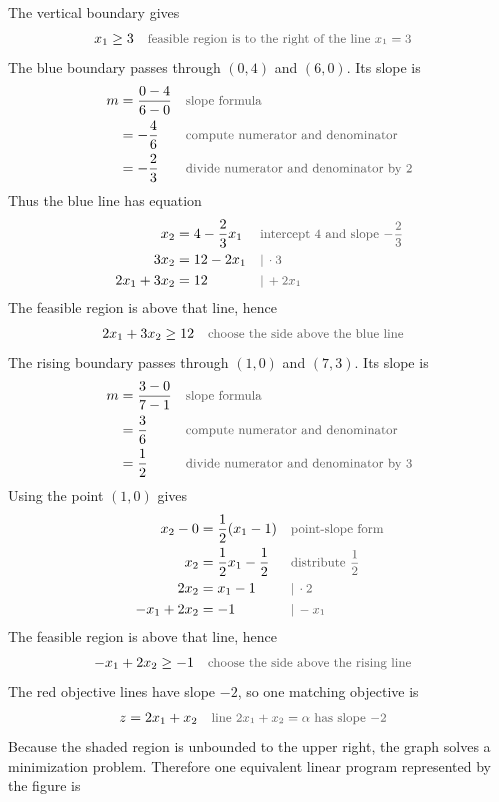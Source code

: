 \documentclass[a4paper,11pt]{article}
\newcommand{\why}[1]{\text{\small\color{black!65}#1}}
\begin{document}
The vertical boundary gives
\begin{align*}
x_1&\ge3 && \why{feasible region is to the right of the line $x_1=3$}
\end{align*}
The blue boundary passes through $(0,4)$ and $(6,0)$. Its slope is
\begin{align*}
m&=\frac{0-4}{6-0} && \why{slope formula}\\
&=-\frac{4}{6} && \why{compute numerator and denominator}\\
&=-\frac{2}{3} && \why{divide numerator and denominator by $2$}
\end{align*}
Thus the blue line has equation
\begin{align*}
x_2&=4-\frac{2}{3}x_1 && \why{intercept $4$ and slope $-\frac23$}\\
3x_2&=12-2x_1 && \why{$|\,\cdot3$}\\
2x_1+3x_2&=12 && \why{$|\,+2x_1$}
\end{align*}
The feasible region is above that line, hence
\begin{align*}
2x_1+3x_2&\ge12 && \why{choose the side above the blue line}
\end{align*}
The rising boundary passes through $(1,0)$ and $(7,3)$. Its slope is
\begin{align*}
m&=\frac{3-0}{7-1} && \why{slope formula}\\
&=\frac{3}{6} && \why{compute numerator and denominator}\\
&=\frac{1}{2} && \why{divide numerator and denominator by $3$}
\end{align*}
Using the point $(1,0)$ gives
\begin{align*}
x_2-0&=\frac12(x_1-1) && \why{point-slope form}\\
x_2&=\frac12x_1-\frac12 && \why{distribute $\frac12$}\\
2x_2&=x_1-1 && \why{$|\,\cdot2$}\\
-x_1+2x_2&=-1 && \why{$|\,-x_1$}
\end{align*}
The feasible region is above that line, hence
\begin{align*}
-x_1+2x_2&\ge-1 && \why{choose the side above the rising line}
\end{align*}
The red objective lines have slope $-2$, so one matching objective is
\begin{align*}
z&=2x_1+x_2 && \why{line $2x_1+x_2=\alpha$ has slope $-2$}
\end{align*}
Because the shaded region is unbounded to the upper right, the graph solves a minimization problem. Therefore one equivalent linear program represented by the figure is
\end{document}
